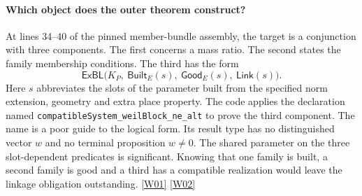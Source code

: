 \documentclass[12pt,letterpaper]{article}
\begin{document}
\paragraph{Which object does the outer theorem construct?}
At lines 34--40 of the pinned member-bundle assembly, the target is a conjunction with three components. The first concerns a mass ratio. The second states the family membership conditions. The third has the form
\[
  \mathsf{ExBL}\bigl(K_P,\ \mathsf{Built}_E(s),\
        \mathsf{Good}_E(s),\ \mathsf{Link}(s)\bigr).
\]
Here \(s\) abbreviates the slots of the parameter built from the specified norm extension, geometry and extra place property. The code applies the declaration named
\texttt{compatibleSystem\_weilBlock\_ne\_alt} to prove the third component. The name is a poor guide to the logical form. Its result type has no distinguished vector \(w\) and no terminal proposition \(w\ne0\). The shared parameter on the three slot-dependent predicates is significant. Knowing that one family is built, a second family is good and a third has a compatible realization would leave the linkage obligation outstanding. \href{https://github.com/nousentllc/riemann-hypothesis/blob/40e56bab026552e089d7afcfeff08d2defb9c005/src/Development/AutomorphicArithmetic/ThetaCorrespondence/ThetaPairLifts/ThirdPlaceSeries/MemberBundlesLargeUnramifiedExponents.lean#L34-L63}{\textsf{[W01]}} \href{https://github.com/nousentllc/riemann-hypothesis/blob/40e56bab026552e089d7afcfeff08d2defb9c005/src/Development/AutomorphicArithmetic/ThetaCorrespondence/ThetaPairLifts/ThirdPlaceSeries/ExistsWeilBlockNeAtMember.lean#L24-L42}{\textsf{[W02]}}
\end{document}
